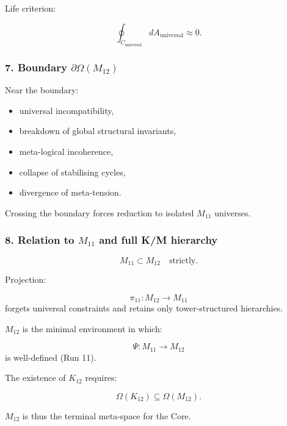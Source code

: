 Life criterion:

\[
\oint_{C_{\mathrm{universal}}} dA_{\mathrm{universal}} \approx 0.
\]

\subsubsection*{7. Boundary $\partial\Omega(M_{12})$}

Near the boundary:

\begin{itemize}
    \item universal incompatibility,
    \item breakdown of global structural invariants,
    \item meta-logical incoherence,
    \item collapse of stabilising cycles,
    \item divergence of meta-tension.
\end{itemize}

Crossing the boundary forces reduction to isolated $M_{11}$ universes.

\subsubsection*{8. Relation to $M_{11}$ and full K/M hierarchy}

\[
M_{11} \subset M_{12}
\quad\text{strictly}.
\]

Projection:

\[
\pi_{11}: M_{12} \to M_{11}
\]
forgets universal constraints and retains only tower-structured hierarchies.

$M_{12}$ is the minimal environment in which:

\[
\Psi: M_{11} \to M_{12}
\]
is well-defined (Run 11).

The existence of $K_{12}$ requires:

\[
\Omega(K_{12}) \subseteq \Omega(M_{12}).
\]

$M_{12}$ is thus the terminal meta-space for the Core.

